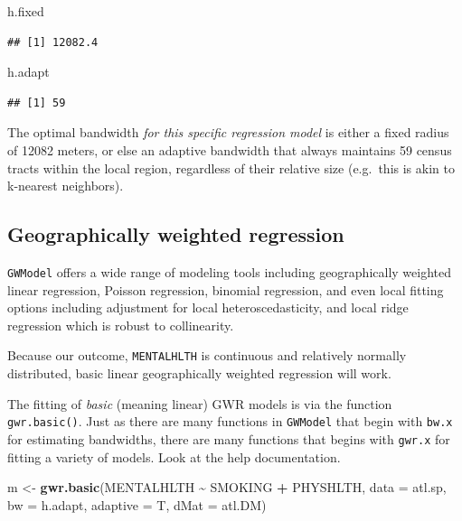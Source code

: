 \documentclass[
]{book}
\newenvironment{Shaded}{\begin{snugshade}}{\end{snugshade}}
\newcommand{\AttributeTok}[1]{\textcolor[rgb]{0.13,0.29,0.53}{#1}}
\newcommand{\FunctionTok}[1]{\textcolor[rgb]{0.13,0.29,0.53}{\textbf{#1}}}
\newcommand{\NormalTok}[1]{#1}
\newcommand{\OtherTok}[1]{\textcolor[rgb]{0.56,0.35,0.01}{#1}}
\newcommand{\SpecialCharTok}[1]{\textcolor[rgb]{0.81,0.36,0.00}{\textbf{#1}}}
\begin{document}
\begin{Shaded}
\begin{Highlighting}[]
\NormalTok{h.fixed}
\end{Highlighting}
\end{Shaded}

\begin{verbatim}
## [1] 12082.4
\end{verbatim}

\begin{Shaded}
\begin{Highlighting}[]
\NormalTok{h.adapt}
\end{Highlighting}
\end{Shaded}

\begin{verbatim}
## [1] 59
\end{verbatim}

The optimal bandwidth \emph{for this specific regression model} is either a fixed radius of 12082 meters, or else an adaptive bandwidth that always maintains 59 census tracts within the local region, regardless of their relative size (e.g.~this is akin to k-nearest neighbors).

\hypertarget{geographically-weighted-regression}{%
\subsection{Geographically weighted regression}\label{geographically-weighted-regression}}

\texttt{GWModel} offers a wide range of modeling tools including geographically weighted linear regression, Poisson regression, binomial regression, and even local fitting options including adjustment for local heteroscedasticity, and local ridge regression which is robust to collinearity.

Because our outcome, \texttt{MENTALHLTH} is continuous and relatively normally distributed, basic linear geographically weighted regression will work.

The fitting of \emph{basic} (meaning linear) GWR models is via the function \texttt{gwr.basic()}. Just as there are many functions in \texttt{GWModel} that begin with \texttt{bw.x} for estimating bandwidths, there are many functions that begins with \texttt{gwr.x} for fitting a variety of models. Look at the help documentation.

\begin{Shaded}
\begin{Highlighting}[]
\NormalTok{m }\OtherTok{\textless{}{-}} \FunctionTok{gwr.basic}\NormalTok{(MENTALHLTH }\SpecialCharTok{\textasciitilde{}}\NormalTok{ SMOKING }\SpecialCharTok{+}\NormalTok{ PHYSHLTH, }
             \AttributeTok{data =}\NormalTok{ atl.sp, }
             \AttributeTok{bw =}\NormalTok{ h.adapt,}
             \AttributeTok{adaptive =}\NormalTok{ T,}
             \AttributeTok{dMat =}\NormalTok{ atl.DM)}
\end{Highlighting}
\end{Shaded}
\end{document}
